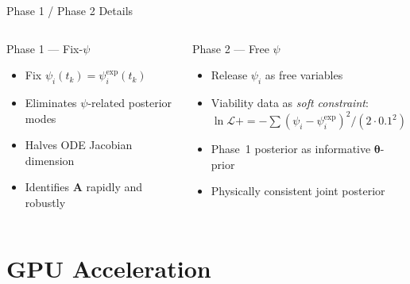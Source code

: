 \documentclass[aspectratio=169,10pt]{beamer}
\newcommand{\btheta}{\boldsymbol{\theta}}
\begin{document}
\begin{frame}[t]{Phase 1 / Phase 2 Details}
  \small
  \begin{columns}[T]
      \begin{block}{Phase 1 — Fix-$\psi$}
        \begin{itemize}
          \item Fix $\psi_i(t_k) = \psi_i^{\mathrm{exp}}(t_k)$
          \item Eliminates $\psi$-related posterior modes
          \item Halves ODE Jacobian dimension
          \item Identifies $\mathbf{A}$ rapidly and robustly
        \end{itemize}
      \end{block}
      \begin{block}{Phase 2 — Free $\psi$}
        \begin{itemize}
          \item Release $\psi_i$ as free variables
          \item Viability data as \emph{soft constraint}:\\
                $\ln\mathcal{L} +{=} -\sum(\psi_i-\psi_i^{\mathrm{exp}})^2/(2\cdot0.1^2)$
          \item Phase~1 posterior as informative $\btheta$-prior
          \item Physically consistent joint posterior
        \end{itemize}
      \end{block}
  \end{columns}
\end{frame}

\section{GPU Acceleration}
\end{document}
